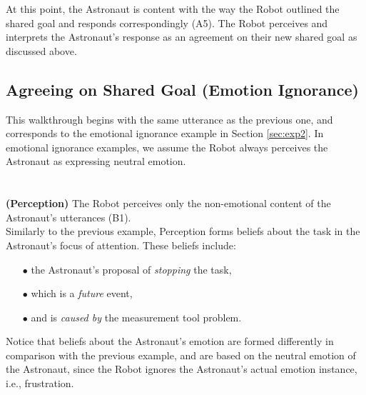 At this point, the Astronaut is content with the way the Robot outlined the
shared goal and responds correspondingly (A5). The Robot perceives and
interprets the Astronaut's response as an agreement on their new shared goal as
discussed above.\\

\noindent{}

\subsection{Agreeing on Shared Goal (Emotion Ignorance)}
\label{sec:wt-exp2}

This walkthrough begins with the same utterance as the previous one, and
corresponds to the emotional ignorance example in Section \ref{sec:exp2}. In
emotional ignorance examples, we assume the Robot always perceives the
Astronaut as expressing neutral emotion.\\

\noindent{}\\ \\

\noindent\textbf{(Perception)} The Robot perceives only the non-emotional
content of the Astronaut's utterances (B1).\\

Similarly to the previous example, Perception forms beliefs about the task in
the Astronaut's focus of attention. These beliefs include:

\begin{itemize}
  \item[$\bullet$] the Astronaut's proposal of \textit{stopping} the task,
  \item[$\bullet$] which is a \textit{future} event,
  \item[$\bullet$] and is \textit{caused by} the measurement tool problem.
\end{itemize}

\noindent Notice that beliefs about the Astronaut's emotion are formed
differently in comparison with the previous example, and are based on the
neutral emotion of the Astronaut, since the Robot ignores the Astronaut's actual
emotion instance, i.e., frustration.\\

